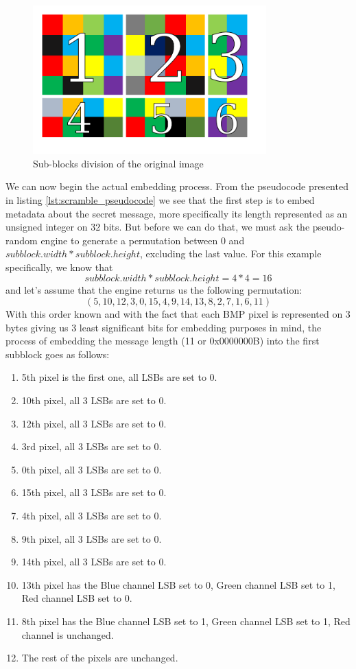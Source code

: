 \begin{figure}[H]
    \centering
    \includegraphics[width=9cm,keepaspectratio]{pics/bmp_scrambling/image_broken_subblocks}
    \caption{Sub-blocks division of the original image}
    \label{scramble_example_subblocks}
\end{figure}

We can now begin the actual embedding process. From the pseudocode presented in listing \ref{lst:scramble_pseudocode} we see that the first step is to embed metadata about the secret message, more specifically its length represented as an unsigned integer on 32 bits. But before we can do that, we must ask the pseudo-random engine to generate a permutation between 0 and $subblock.width * subblock.height$, excluding the last value. For this example specifically, we know that
\[ subblock.width * subblock.height = 4 * 4 = 16 \]
and let's assume that the engine returns us the following permutation: 
\[(5,10,12,3,0,15,4,9,14,13,8,2,7,1,6,11) \]
With this order known and with the fact that each BMP pixel is represented on 3 bytes giving us 3 least significant bits for embedding purposes in mind, the process of embedding the message length (11 or 0x0000000B) into the first subblock goes as follows:
\begin{enumerate}
  \item 5th pixel is the first one, all LSBs are set to 0.
  \item 10th pixel, all 3 LSBs are set to 0.
  \item 12th pixel, all 3 LSBs are set to 0.
  \item 3rd pixel, all 3 LSBs are set to 0.
  \item 0th pixel, all 3 LSBs are set to 0.
  \item 15th pixel, all 3 LSBs are set to 0.
  \item 4th pixel, all 3 LSBs are set to 0.
  \item 9th pixel, all 3 LSBs are set to 0.
  \item 14th pixel, all 3 LSBs are set to 0.
  \item 13th pixel has the Blue channel LSB set to 0, Green channel LSB set to 1, Red channel LSB set to 0.
  \item 8th pixel has the Blue channel LSB set to 1, Green channel LSB set to 1, Red channel is unchanged.
  \item The rest of the pixels are unchanged.
\end{enumerate}


